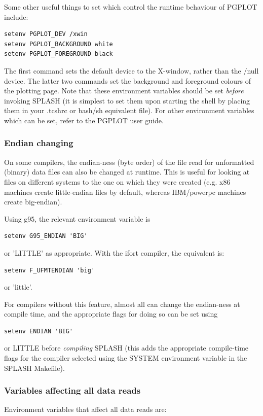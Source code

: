 \documentclass[a4paper,10pt]{article}
\newcommand{\splash}{\textsc{SPLASH }}
\begin{document}
Some other useful things to set which control the runtime behaviour of PGPLOT include:
\begin{verbatim}
setenv PGPLOT_DEV /xwin
setenv PGPLOT_BACKGROUND white
setenv PGPLOT_FOREGROUND black
\end{verbatim}
The first command sets the default device to the X-window, rather than the /null
device. The latter two commands set the background and foreground colours of the
plotting page. Note that these environment variables should be set \emph{before}
invoking \splash (it is simplest to set them upon starting the shell by placing
them in your .tcshrc or bash/sh equivalent file). For other environment
variables which can be set, refer to the PGPLOT user guide.

\subsubsection{ Endian changing}
 On some compilers, the endian-ness (byte order) of the file read for unformatted (binary) data files can also be changed at runtime. This is useful for looking at files on different systems to the one on which they were created (e.g. x86 machines create little-endian files by default, whereas IBM/powerpc machines create big-endian).
 
  Using g95, the relevant environment variable is
\begin{verbatim}
setenv G95_ENDIAN 'BIG'
\end{verbatim}
or 'LITTLE' as appropriate. With the ifort compiler, the equivalent is:
\begin{verbatim}
setenv F_UFMTENDIAN 'big'
\end{verbatim}
or 'little'. 

 For compilers without this feature, almost all can change the endian-ness at compile time, and the appropriate flags for doing so can be set using
\begin{verbatim}
setenv ENDIAN 'BIG'
\end{verbatim}
or LITTLE before \emph{compiling} \splash (this adds the appropriate compile-time flags for the compiler selected using the SYSTEM environment variable in the \splash Makefile). 

\subsubsection{ Variables affecting all data reads}
Environment variables that affect all data reads are:\newline
\end{document}
